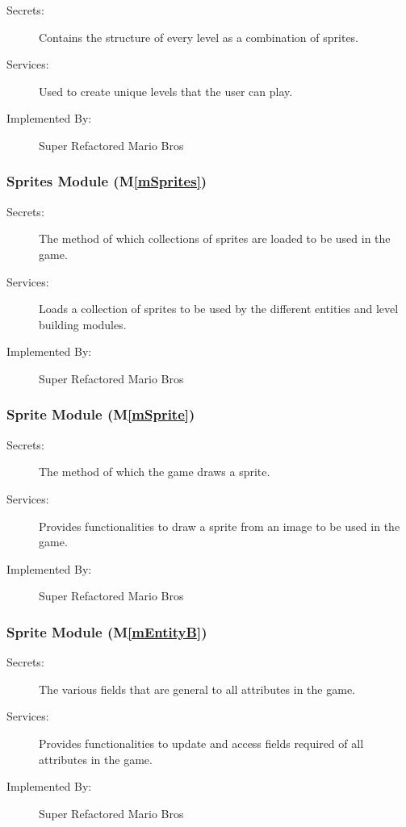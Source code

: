 \documentclass[12pt, titlepage]{article}
\newcommand{\mref}[1]{M\ref{#1}}
\begin{document}
\begin{description}
\item[Secrets:] Contains the structure of every level as a combination of sprites.
\item[Services:] Used to create unique levels that the user can play.
\item[Implemented By:] Super Refactored Mario Bros
\end{description}

\subsubsection{Sprites Module (\mref{mSprites})}

\begin{description}
\item[Secrets:] The method of which collections of sprites are loaded to be used in the game.
\item[Services:] Loads a collection of sprites to be used by the different entities and level building modules.
\item[Implemented By:] Super Refactored Mario Bros
\end{description}

\subsubsection{Sprite Module (\mref{mSprite})}

\begin{description}
\item[Secrets:] The method of which the game draws a sprite.
\item[Services:] Provides functionalities to draw a sprite from an image to be used in the game.
\item[Implemented By:] Super Refactored Mario Bros
\end{description}

\subsubsection{Sprite Module (\mref{mEntityB})}

\begin{description}
\item[Secrets:] The various fields that are general to all attributes in the game.
\item[Services:] Provides functionalities to update and access fields required of all attributes in the game.
\item[Implemented By:] Super Refactored Mario Bros
\end{description}
\end{document}
